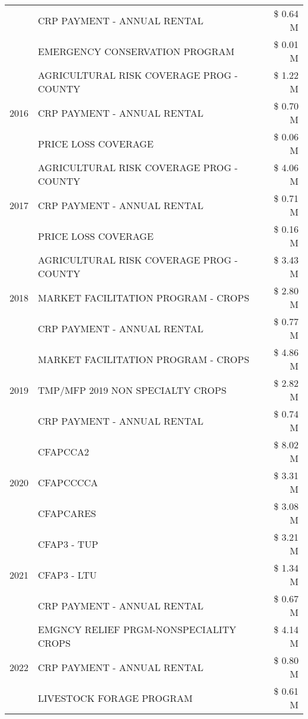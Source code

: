 \begin{tabular}{llr}
 & CRP PAYMENT - ANNUAL RENTAL & \$ 0.64 M \\
 & EMERGENCY CONSERVATION PROGRAM & \$ 0.01 M \\
\cline{1-3}
\multirow[t]{3}{*}{2016} & AGRICULTURAL RISK COVERAGE PROG - COUNTY & \$ 1.22 M \\
 & CRP PAYMENT - ANNUAL RENTAL & \$ 0.70 M \\
 & PRICE LOSS COVERAGE & \$ 0.06 M \\
\cline{1-3}
\multirow[t]{3}{*}{2017} & AGRICULTURAL RISK COVERAGE PROG - COUNTY & \$ 4.06 M \\
 & CRP PAYMENT - ANNUAL RENTAL & \$ 0.71 M \\
 & PRICE LOSS COVERAGE & \$ 0.16 M \\
\cline{1-3}
\multirow[t]{3}{*}{2018} & AGRICULTURAL RISK COVERAGE PROG - COUNTY & \$ 3.43 M \\
 & MARKET FACILITATION PROGRAM - CROPS & \$ 2.80 M \\
 & CRP PAYMENT - ANNUAL RENTAL & \$ 0.77 M \\
\cline{1-3}
\multirow[t]{3}{*}{2019} & MARKET FACILITATION PROGRAM - CROPS & \$ 4.86 M \\
 & TMP/MFP 2019 NON SPECIALTY CROPS & \$ 2.82 M \\
 & CRP PAYMENT - ANNUAL RENTAL & \$ 0.74 M \\
\cline{1-3}
\multirow[t]{3}{*}{2020} & CFAPCCA2 & \$ 8.02 M \\
 & CFAPCCCCA & \$ 3.31 M \\
 & CFAPCARES & \$ 3.08 M \\
\cline{1-3}
\multirow[t]{3}{*}{2021} & CFAP3 - TUP & \$ 3.21 M \\
 & CFAP3 - LTU & \$ 1.34 M \\
 & CRP PAYMENT - ANNUAL RENTAL & \$ 0.67 M \\
\cline{1-3}
\multirow[t]{3}{*}{2022} & EMGNCY RELIEF PRGM-NONSPECIALITY CROPS & \$ 4.14 M \\
 & CRP PAYMENT - ANNUAL RENTAL & \$ 0.80 M \\
 & LIVESTOCK FORAGE PROGRAM & \$ 0.61 M \\
\cline{1-3}
\bottomrule
\end{tabular}
